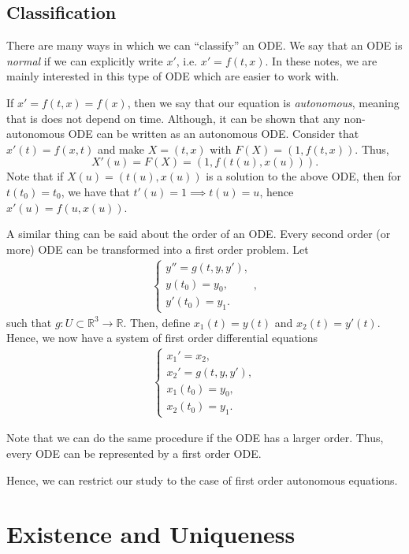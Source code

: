 \subsection{Classification}
There are many ways in which we can ``classify'' an ODE.
We say that an ODE is \textit{normal} if we can explicitly write $x'$, 
i.e. $x' = f(t,x)$. In these notes, we are mainly interested in this type
of ODE which are easier to work with.

If $x' = f(t,x) = f(x)$, then we say that our equation is \textit{autonomous},
meaning that is does not depend on time. Although, it can be shown that
any non-autonomous ODE can be written as an autonomous ODE. Consider that
$x'(t) = f(x,t)$ and make $X = (t,x)$ with $F(X) = (1, f(t,x))$. Thus,
\begin{displaymath}
  X'(u)  = F(X) = (1, f(t(u), x(u))).
\end{displaymath}
Note that if $X(u) = (t(u),x(u))$ is a solution to the above ODE, then
for $t(t_0) =t_0$, we have that $t'(u) = 1 \implies t(u)= u$, hence
$x'(u) = f(u,x(u))$.

A similar thing can be said about the order of an ODE.
Every second order (or more) ODE can be transformed into a first order problem.
Let
\begin{align*}
  \begin{cases}
 y'' = g(t,y,y'), \\
 y(t_0) = y_0, \\
 y'(t_0) = y_1.
  \end{cases},
\end{align*}
such that $g:U\subset \mathbb R^3 \to \mathbb R$. Then, define $x_1(t)=y(t)$
and $x_2(t) = y'(t)$. Hence, we now have a system of first order differential
equations
\begin{align*}
  \begin{cases}
 x_1' = x_2, \\
 x_2' = g(t,y,y'), \\
 x_1(t_0) = y_0, \\
 x_2(t_0) = y_1.
  \end{cases}
\end{align*}

Note that we can do the same procedure if the ODE has a larger order. Thus,
every ODE can be represented by a first order ODE.

Hence, we can restrict our study to the case of first order autonomous equations.

\section{Existence and Uniqueness}

